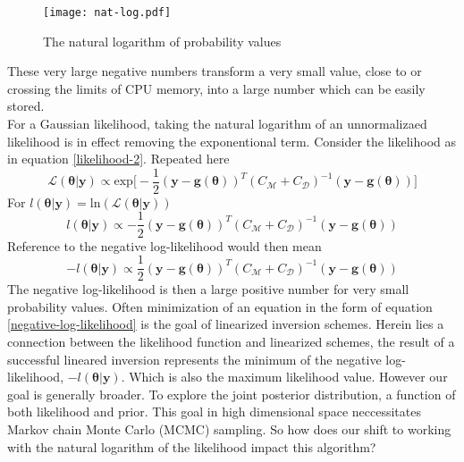 \begin{figure}[H]
	\centering
	\texttt{[image: nat-log.pdf]}
	\caption{The natural logarithm of probability values}
	\label{nat-log}
\end{figure}

These very large negative numbers transform a very small value, close to or crossing the limits of CPU memory, into a large number which can be easily stored. \\

For a Gaussian likelihood, taking the natural logarithm of an unnormalizaed likelihood is in effect removing the exponentional term. Consider the likelihood as in equation \ref{likelihood-2}. Repeated here
\begin{equation}
\mathcal{L}(\bm{\theta}|\bm{y}) \propto \text{exp}\bigg[-\frac{1}{2}(\bm{y}-\bm{g}(\bm{\theta}))^T(C_{\mathcal{M}}+C_{\mathcal{D}})^{-1}(\bm{y}-\bm{g}(\bm{\theta}))\bigg]
\label{repeat-likelihood-2}
\end{equation}
For $l(\bm{\theta}|\bm{y}) = \text{ln}(\mathcal{L}(\bm{\theta}|\bm{y}))$
\begin{equation}
l(\bm{\theta}|\bm{y}) \propto -\frac{1}{2}(\bm{y}-\bm{g}(\bm{\theta}))^T(C_{\mathcal{M}}+C_{\mathcal{D}})^{-1}(\bm{y}-\bm{g}(\bm{\theta}))
\label{log-likelihood}
\end{equation}
Reference to the negative log-likelihood would then mean
\begin{equation}
-l(\bm{\theta}|\bm{y}) \propto \frac{1}{2}(\bm{y}-\bm{g}(\bm{\theta}))^T(C_{\mathcal{M}}+C_{\mathcal{D}})^{-1}(\bm{y}-\bm{g}(\bm{\theta}))
\label{negative-log-likelihood}
\end{equation}
The negative log-likelihood is then a large positive number for very small probability values. Often minimization of an equation in the form of equation \ref{negative-log-likelihood} is the goal of linearized inversion schemes. Herein lies a connection between the likelihood function and linearized schemes, the result of a successful lineared inversion represents the minimum of the negative log-likelihood, $-l(\bm{\theta}|\bm{y})$. Which is also the maximum likelihood value. However our goal is generally broader. To explore the joint posterior distribution, a function of both likelihood and prior. This goal in high dimensional space neccessitates Markov chain Monte Carlo (MCMC) sampling. So how does our shift to working with the natural logarithm of the likelihood impact this algorithm? \\

